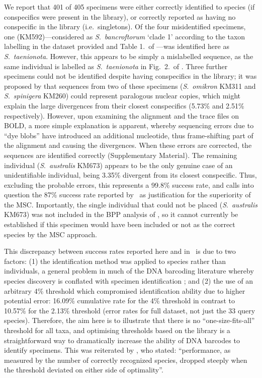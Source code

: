 \documentclass[12pt]{article}
\begin{document}
We report that 401 of 405 specimens were either correctly identified to species (if conspecifics were present in the library), or correctly reported as having no conspecific in the library (i.e.\ singletons).  Of the four misidentified specimens, one (KM592)---considered as \emph{S}.\ \emph{bancroftorum} `clade 1' according to the taxon labelling in the dataset provided and Table 1.\ of \citeauthor{Dowton2014}---was identified here as \emph{S}.\ \emph{taenionota}. However, this appears to be simply a mislabelled sequence, as the same individual is labelled as  \emph{S}.\ \emph{taenionota} in Fig.\ 2.\ of \citet{Meiklejohn2013}. Three further specimens could not be identified despite having conspecifics in the library; it was proposed by \citet{Meiklejohn2012} that sequences from two of these specimens (\emph{S}.\ \emph{omikron} KM311 and  \emph{S}.\ \emph{spinigera} KM260) could represent paralogous nuclear copies, which might explain the large divergences from their closest conspecifics (5.73\% and 2.51\% respectively). However, upon examining the alignment and the trace files on BOLD, a more simple explanation is apparent, whereby sequencing errors due to ``dye blobs'' have introduced an additional nucleotide, thus frame-shifting part of the alignment and causing the divergences. When these errors are corrected, the sequences are identified correctly (Supplementary Material).  The remaining individual (\emph{S}.\ \emph{australis} KM673) appears to be the only genuine case of an unidentifiable individual, being 3.35\% divergent from its closest conspecific. Thus, excluding the probable errors, this represents a 99.8\% success rate, and calls into question the 87\% success rate reported by \citeauthor{Dowton2014}\ as justification for the superiority of the MSC. Importantly, the single individual that could not be placed (\emph{S}.\ \emph{australis} KM673) was not included in the BPP analysis of \citeauthor{Dowton2014}, so it cannot currently be established if this specimen would have been included or not as the correct species by the MSC approach. 

This discrepancy between success rates reported here and in \citeauthor{Dowton2014}\ is due to two factors: (1) the identification method was applied to species rather than individuals, a general problem in much of the DNA barcoding literature whereby species discovery is conflated with specimen identification \citep{Collins2013}; and (2) the use of an arbitrary 4\% threshold which compromised identification ability due to higher potential error: 16.09\% cumulative rate for the 4\% threshold in contrast to 10.57\% for the 2.13\% threshold (error rates for full dataset, not just the 33 query species). Therefore, the aim here is to illustrate that there is no ``one-size-fits-all'' threshold for all taxa, and optimising thresholds based on the library is a straightforward way to dramatically increase the ability of DNA barcodes to identify specimens. This was reiterated by \citet{Ratnasingham2013}, who stated: ``performance, as measured by the number of correctly recognized species, dropped steeply when the threshold deviated on either side of optimality''.
\end{document}
